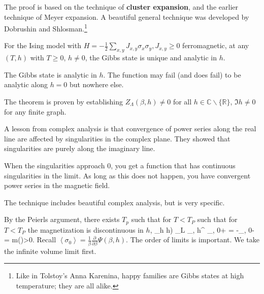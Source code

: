 The proof is based on the technique of \textbf{cluster expansion}, and the earlier technique of Meyer expansion. A beautiful general technique was developed by Dobrushin %
and Shlosman.\footnote{Like in Tolstoy's Anna Karenina, happy families are Gibbs states at high temperature; they are all alike.}

\begin{theorem}
For the Ising model with $H=-\frac{1}{2} \sum_{x,y} J_{x,y} \sigma_x\sigma_y, J_{x,y} \ge 0$ ferromagnetic, at any $(T,h)$ with $T\ge 0$, $h\ne 0$, the Gibbs state is unique and analytic in $h$. %
\end{theorem}
The Gibbs state is analytic in $h$. The function may fail (and does fail) to be analytic along $h=0$ but nowhere else. 

The theorem is proven by establishing $Z_\Lambda (\beta, h)\ne 0$ for all $h\in \mathbb{C}\backslash \{\mathbb{R}\}$, $\Im h\ne 0$ for any finite graph.

A lesson from complex analysis is that convergence of power series along the real line are affected by singularities in the complex plane. They showed that singularities are purely along the imaginary line.

When the singularities approach 0, you get a function that has continuous singularities in the limit. As long as this does not happen, you have convergent power series in the magnetic field.

The technique includes beautiful complex analysis, but is very specific.

By the Peierls argument, there exists $T_p$ such that for $T<T_P$ such that for $T<T_P$ the magnetization is discontinuous in $h$,
\be
\lim_{h
h)}
\lim_{L\nearrow \infty} \left{}\right\rangle_{\beta, h}^{}
\left{}\right\rangle_{\beta, 0+} = -\left{}\right\rangle_{\beta, 0-} = m(\beta)>0.
\ee
Recall $\left\langle {\sigma_0}\right\rangle = \frac{1}{\beta} \frac{\partial}{\partial \beta}\Psi(\beta, h)$.
The order of limits is important. We take the infinite volume limit first.

